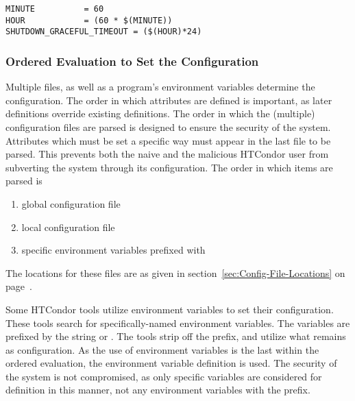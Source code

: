 \begin{verbatim}
MINUTE          = 60
HOUR            = (60 * $(MINUTE))
SHUTDOWN_GRACEFUL_TIMEOUT = ($(HOUR)*24)
\end{verbatim}

\subsubsection{\label{sec:Ordering-Config-File}Ordered Evaluation to
Set the Configuration} 

Multiple files, as well as a program's environment variables
determine the configuration.
The order in which attributes are defined is important, as later
definitions override existing definitions.
The order in which the (multiple) configuration files are parsed 
is designed to ensure the security of the system.
Attributes which must be set a specific way 
must appear in the last file to be parsed.
This prevents both the naive and the malicious HTCondor user 
from subverting the system through its configuration.
The order in which items are parsed is
\begin{enumerate}
\item global configuration file
\item local configuration file
\item specific environment variables prefixed with 
\end{enumerate}

The locations for these files are as given in
section~\ref{sec:Config-File-Locations} on
page~\pageref{sec:Config-File-Locations}.

Some HTCondor tools utilize environment variables to set their
configuration.
These tools search for specifically-named environment variables.
The variables are prefixed by the string 
or .
The tools strip off the prefix, and utilize what remains
as configuration.
As the use of environment variables is the last within
the ordered evaluation, 
the environment variable definition is used.
The security of the system is not compromised,
as only specific variables are considered for definition
in this manner, not any environment variables with
the  prefix.


